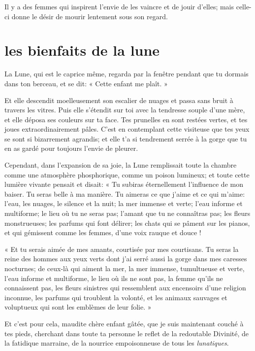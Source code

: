 Il y a des femmes qui inspirent l’envie de les vaincre
et de jouir d’elles; mais celle{}-ci donne le désir de
mourir lentement sous son regard.


\quebra\section[Les bienfaits de la lune]{les bienfaits de la lune }

La Lune, qui est le caprice même, regarda par la fenêtre pendant que tu
dormais dans ton berceau, et se dit: « Cette enfant me plaît. »

Et elle descendit moelleusement son escalier de nuages et passa sans
bruit à travers les vitres. Puis elle s’étendit sur
toi avec la tendresse souple d’une mère, et elle
déposa ses couleurs sur ta face. Tes prunelles en sont restées vertes,
et tes joues extraordinairement pâles. C’est en
contemplant cette visiteuse que tes yeux se sont si bizarrement
agrandis; et elle t’a si tendrement serrée à la gorge
que tu en as gardé pour toujours l’envie de pleurer.

Cependant, dans l’expansion de sa joie, la Lune
remplissait toute la chambre comme une atmosphère phosphorique, comme
un poison lumineux; et toute cette lumière vivante pensait et disait: «
Tu subiras éternellement l’influence de mon baiser. Tu
seras belle à ma manière. Tu aimeras ce que j’aime et
ce qui m’aime: l’eau, les nuages, le
silence et la nuit; la mer immense et verte; l’eau
informe et multiforme; le lieu où tu ne seras pas;
l’amant que tu ne connaîtras pas; les fleurs
monstrueuses; les parfums qui font délirer; les chats qui se pâment sur
les pianos, et qui gémissent comme les femmes, d’une
voix rauque et douce !

« Et tu serais aimée de mes amants, courtisée par mes courtisans. Tu
seras la reine des hommes aux yeux verts dont j’ai
serré aussi la gorge dans mes caresses nocturnes; de ceux{}-là qui
aiment la mer, la mer immense, tumultueuse et verte,
l’eau informe et multiforme, le lieu où ils ne sont
pas, la femme qu’ils ne connaissent pas, les fleurs
sinistres qui ressemblent aux encensoirs d’une
religion inconnue, les parfums qui troublent la volonté, et les animaux
sauvages et voluptueux qui sont les emblèmes de leur folie. »

\quebra
Et c’est pour cela, maudite chère enfant gâtée, que je
suis maintenant couché à tes pieds, cherchant dans toute ta personne le
reflet de la redoutable Divinité, de la fatidique marraine, de la
nourrice empoisonneuse de tous les \textit{lunatiques}.

